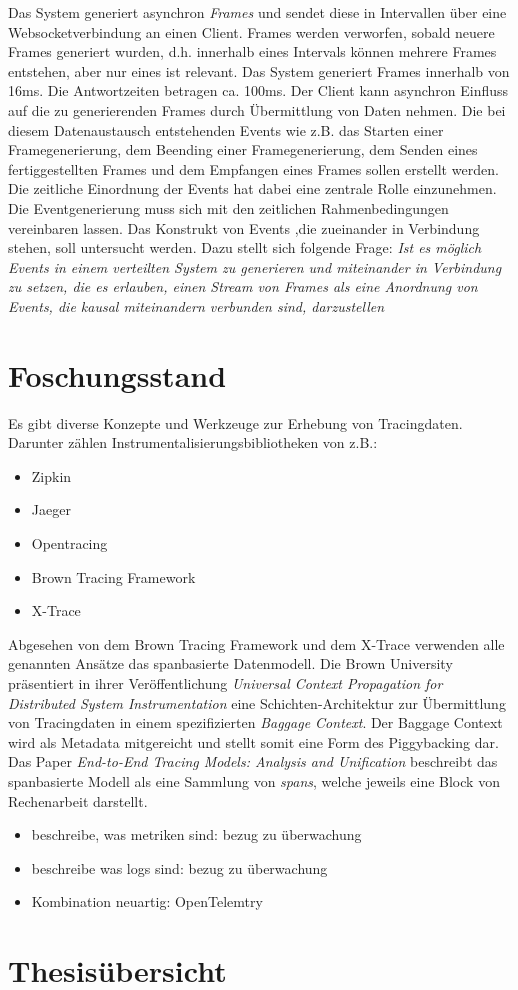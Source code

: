 	Das System generiert asynchron \emph{Frames} und sendet diese in Intervallen über eine Websocketverbindung an einen Client. Frames werden verworfen, sobald neuere Frames generiert wurden, d.h. innerhalb eines Intervals können mehrere Frames entstehen, aber nur eines ist relevant. Das System generiert Frames innerhalb von 16ms. Die Antwortzeiten betragen ca. 100ms. Der Client kann asynchron Einfluss auf die zu generierenden Frames durch Übermittlung von Daten nehmen. Die bei diesem Datenaustausch entstehenden Events wie z.B. das Starten einer Framegenerierung, dem Beending einer Framegenerierung, dem Senden eines fertiggestellten Frames und dem Empfangen eines Frames sollen erstellt werden. Die zeitliche Einordnung der Events hat dabei eine zentrale Rolle einzunehmen. Die Eventgenerierung muss sich mit den zeitlichen Rahmenbedingungen vereinbaren lassen. Das Konstrukt von Events ,die zueinander in Verbindung stehen, soll untersucht werden. Dazu stellt sich folgende Frage: \emph{Ist es möglich Events in einem verteilten System zu generieren und miteinander in Verbindung zu setzen, die es erlauben, einen Stream von Frames als eine Anordnung von Events, die kausal miteinandern verbunden sind, darzustellen}
\section{Foschungsstand}
\label{section:Forschungsstand}

Es gibt diverse Konzepte und Werkzeuge zur Erhebung von Tracingdaten. Darunter zählen Instrumentalisierungsbibliotheken von z.B.:
\begin{itemize}
	\item Zipkin
	\item Jaeger
	\item Opentracing
	\item Brown Tracing Framework
	\item X-Trace
\end{itemize}
Abgesehen von dem Brown Tracing Framework und dem X-Trace verwenden alle genannten Ansätze das spanbasierte Datenmodell. Die Brown University präsentiert in ihrer Veröffentlichung \emph{Universal Context Propagation for Distributed System Instrumentation} eine Schichten-Architektur zur Übermittlung von Tracingdaten in einem spezifizierten \emph{Baggage Context}. Der Baggage Context wird als Metadata mitgereicht und stellt somit eine Form des Piggybacking dar. Das Paper \emph{End-to-End Tracing Models: Analysis and Unification} beschreibt das spanbasierte Modell als eine Sammlung von \emph{spans}, welche jeweils eine Block von Rechenarbeit darstellt.
\begin{itemize}
\item beschreibe, was metriken sind: bezug zu überwachung
\item beschreibe was logs sind: bezug zu überwachung
\item Kombination neuartig: OpenTelemtry
\end{itemize}

\section{Thesisübersicht}
\label{section:Thesisübersicht}

